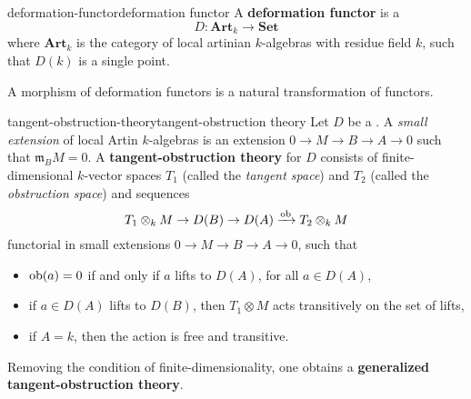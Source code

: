 \begin{topic}{deformation-functor}{deformation functor}
    A \textbf{deformation functor} is a 
    \[ D \colon \textbf{Art}_k \to \textbf{Set} \]
    where $\textbf{Art}_k$ is the category of local artinian $k$-algebras with residue field $k$, such that $D(k)$ is a single point.
    
    A morphism of deformation functors is a natural transformation of functors.
\end{topic}

\begin{topic}{tangent-obstruction-theory}{tangent-obstruction theory}
    Let $D$ be a . A \textit{small extension} of local Artin $k$-algebras is an extension $0 \to M \to B \to A \to 0$ such that $\mathfrak{m}_B M = 0$. A \textbf{tangent-obstruction theory} for $D$ consists of finite-dimensional $k$-vector spaces $T_1$ (called the \textit{tangent space}) and $T_2$ (called the \textit{obstruction space}) and sequences
    \[ T_1 \otimes_k M \to D(B) \to D(A) \xrightarrow{\textup{ob}} T_2 \otimes_k M \]
    functorial in small extensions $0 \to M \to B \to A \to 0$, such that
    \begin{itemize}
        \item $\textup{ob}(a) = 0$ if and only if $a$ lifts to $D(A)$, for all $a \in D(A)$,
        \item if $a \in D(A)$ lifts to $D(B)$, then $T_1 \otimes M$ acts transitively on the set of lifts,
        \item if $A = k$, then the action is free and transitive.
    \end{itemize}
    Removing the condition of finite-dimensionality, one obtains a \textbf{generalized tangent-obstruction theory}.
\end{topic}

